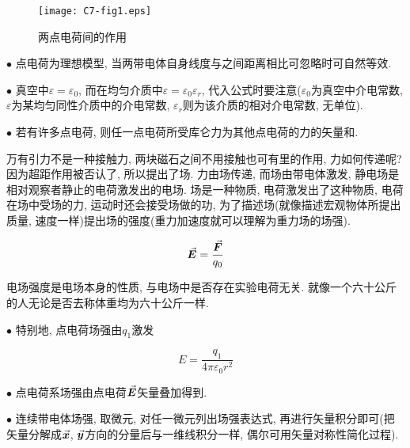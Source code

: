 \begin{figure}[H]
	\centering
	\texttt{[image: C7-fig1.eps]}
	\caption{两点电荷间的作用}
	\label{C7-fig1}
\end{figure}

\begin{note}
	
	$\bullet$ 点电荷为理想模型, 当两带电体自身线度与之间距离相比可忽略时可自然等效. 
	
	$\bullet$ 真空中$\varepsilon=\varepsilon_0$, 而在均匀介质中$\varepsilon=\varepsilon_0\varepsilon_r$, 代入公式时要注意($\varepsilon_0$为真空中介电常数, $\varepsilon$为某均匀同性介质中的介电常数, $\varepsilon_r$则为该介质的相对介电常数, 无单位). 
	
	$\bullet$ 若有许多点电荷, 则任一点电荷所受库仑力为其他点电荷的力的矢量和. 
	
\end{note}

\begin{definition}[电场]
	万有引力不是一种接触力, 两块磁石之间不用接触也可有里的作用, 力如何传递呢? 因为超距作用被否认了, 所以提出了场. 力由场传递, 而场由带电体激发, 静电场是相对观察者静止的电荷激发出的电场. 场是一种物质, 电荷激发出了这种物质, 电荷在场中受场的力, 运动时还会接受场做的功, 为了描述场(就像描述宏观物体所提出质量, 速度一样)提出场的强度(重力加速度就可以理解为重力场的场强). 
\end{definition}

\begin{definition}[电场强度]
	
	\begin{equation}
		\va*{E} = \dfrac{\va*{F}}{q_0} \label{C7-eq2}
	\end{equation}
	
	电场强度是电场本身的性质, 与电场中是否存在实验电荷无关. 就像一个六十公斤的人无论是否去称体重均为六十公斤一样. 
	
	$\bullet$ 特别地, 点电荷场强由$q_1$激发
	
	\begin{equation}
		E = \dfrac{q_1}{4 \pi \varepsilon_0 r^2} \label{C7-eq3}
	\end{equation}
	
	$\bullet$ 点电荷系场强由点电荷$\va*{E}$矢量叠加得到. 
	
	$\bullet$ 连续带电体场强, 取微元, 对任一微元列出场强表达式, 再进行矢量积分即可(把矢量分解成$\va*{x}$, $\va*{y}$方向的分量后与一维线积分一样, 偶尔可用矢量对称性简化过程). 
	
\end{definition}

